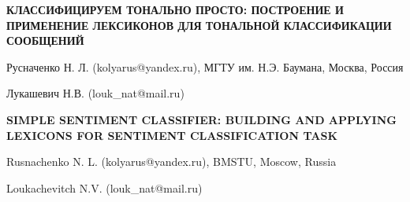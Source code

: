 \documentclass[a4paper,11pt]{extarticle}
\begin{document}
    \newcommand\twitter{{\it Twitter }}

    \begin{center}
        \bf
        КЛАССИФИЦИРУЕМ ТОНАЛЬНО ПРОСТО: ПОСТРОЕНИЕ И ПРИМЕНЕНИЕ ЛЕКСИКОНОВ ДЛЯ
        ТОНАЛЬНОЙ КЛАССИФИКАЦИИ СООБЩЕНИЙ
    \end{center}
    \begin{center}
        Русначенко Н. Л. (kolyarus@yandex.ru),
        МГТУ им. Н.Э. Баумана, Москва, Россия

        Лукашевич Н.В. (louk\_nat@mail.ru)
    \end{center}
    \begin{center}
        \bf
        SIMPLE SENTIMENT CLASSIFIER: BUILDING AND APPLYING LEXICONS FOR SENTIMENT
        CLASSIFICATION TASK
    \end{center}
    \begin{center}
        Rusnachenko N. L. (kolyarus@yandex.ru), BMSTU, Moscow, Russia

        Loukachevitch N.V. (louk\_nat@mail.ru)
    \end{center}


    

    

    

    

    

    

    

    

    \clearpage
    \newpage
\end{document}
